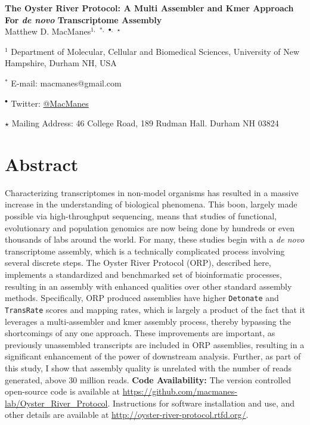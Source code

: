 \documentclass[10pt,letterpaper]{article}
\date{}
\begin{document}
\vspace*{0.35in}


\begin{flushleft}

{\Large
\textbf{The Oyster River Protocol: A Multi Assembler and Kmer Approach For \textit{de novo} Transcriptome Assembly }}
\\
Matthew D. MacManes$^{1,}$ $^{\ast,}$ $^{\bullet,}$ $^\star$

$^{1}$ Department of Molecular, Cellular and Biomedical Sciences, University of New Hampshire, Durham NH, USA

$^\ast$ E-mail: macmanes@gmail.com

$^\bullet$ Twitter: \href{http://twitter.com/macmanes}{@MacManes}

$\star$ Mailing Address: 46 College Road, 189 Rudman Hall. Durham NH 03824
\end{flushleft}


\newpage

\linenumbers

\section*{Abstract}

Characterizing transcriptomes in non-model organisms has resulted in a massive increase in the understanding of biological phenomena. This boon, largely made possible via high-throughput sequencing, means that studies of functional, evolutionary and population genomics are now being done by hundreds or even thousands of labs around the world. For many, these studies begin with a \textit{de novo} transcriptome assembly, which is a technically complicated process involving several discrete steps. The Oyster River Protocol (ORP), described here, implements a standardized and benchmarked set of bioinformatic processes, resulting in an assembly with enhanced qualities over other standard assembly methods. Specifically, ORP produced assemblies have higher \texttt{Detonate} and \texttt{TransRate} scores and mapping rates, which is largely a product of the fact that it leverages a multi-assembler and kmer assembly process, thereby bypassing the shortcomings of any one approach. These improvements are important, as previously unassembled transcripts are included in ORP assemblies, resulting in a significant enhancement of the power of downstream analysis. Further, as part of this study, I show that assembly quality is unrelated with the number of reads generated, above 30 million reads.  \textbf{Code Availability:} The version controlled open-source code is available at \url{https://github.com/macmanes-lab/Oyster_River_Protocol}.  Instructions for software installation and use, and other details are available at \url{http://oyster-river-protocol.rtfd.org/}.
\end{document}

